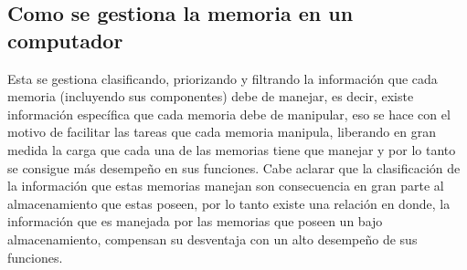 \documentclass[12pt]{article}
\begin{document}
\begin{itemize}
\section{Como se gestiona la memoria en un computador}
Esta se gestiona clasificando, priorizando y filtrando la información que cada memoria (incluyendo sus componentes) debe de manejar, es decir, existe información específica que cada memoria debe de manipular, eso se hace con el motivo de facilitar las tareas que cada memoria manipula, liberando en gran medida la carga que cada una de las memorias tiene que manejar y por lo tanto se consigue más desempeño en sus funciones. Cabe aclarar que la clasificación de la información que estas memorias manejan son consecuencia en gran parte al almacenamiento que estas poseen, por lo tanto existe una relación en donde, la información que es manejada por las memorias que poseen un bajo almacenamiento, compensan su desventaja con un alto desempeño de sus funciones.
\cite{Doc}
\label{conclulsion}



\end{itemize}
\end{document}
